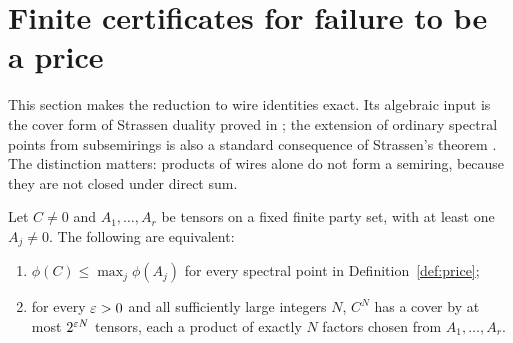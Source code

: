\section{Finite certificates for failure to be a price}
\label{sec:duality}

This section makes the reduction to wire identities exact. Its
algebraic input is the cover form of Strassen duality proved in
\cite[Theorem A.6, pp.~20--21]{Anthropic2026}; the extension of
ordinary spectral points from subsemirings is also a standard
consequence of Strassen's theorem \cite[Theorem 4.16]{wz-spectra}.
The distinction matters: products of wires alone do not form a
semiring, because they are not closed under direct sum.

\begin{theorem}\label{thm:coverduality}
Let $C\ne0$ and $A_1,\ldots,A_r$ be tensors on a fixed finite
party set, with at least one $A_j\ne0$.
The following are equivalent:
\begin{enumerate}
\item $\phi(C)\le\max_j\phi(A_j)$ for every spectral point in
Definition~\ref{def:price};
\item for every $\varepsilon>0$ and all sufficiently large integers $N$,
$C^N$ has a cover by at most $2^{\varepsilon N}$ tensors, each a product
of exactly $N$ factors chosen from $A_1,\ldots,A_r$.
\end{enumerate}
\end{theorem}


